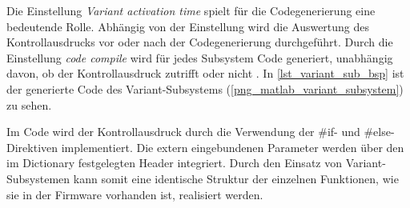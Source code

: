 Die Einstellung \textit{Variant activation time} spielt für die Codegenerierung eine bedeutende Rolle. Abhängig von der Einstellung wird die Auswertung des Kontrollausdrucks vor oder nach der Codegenerierung durchgeführt. Durch die Einstellung \textit{code compile} wird für jedes Subsystem Code generiert, unabhängig davon, ob der Kontrollausdruck zutrifft oder nicht \cite{Matlab_variant_Subsystem_codegen}. In \autoref{lst_variant_sub_bsp} ist der generierte Code des Variant-Subsystems (\autoref{png_matlab_variant_subsystem}) zu sehen. 
 
Im Code wird der Kontrollausdruck durch die Verwendung der \#if- und \#else-Direktiven implementiert. Die extern eingebundenen Parameter werden über den im Dictionary festgelegten Header integriert. Durch den Einsatz von Variant-Subsystemen kann somit eine identische Struktur der einzelnen Funktionen, wie sie in der Firmware vorhanden ist, realisiert werden.

